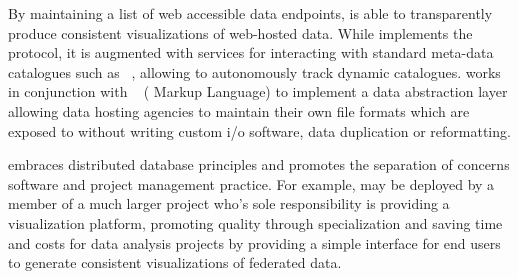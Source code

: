 By maintaining a list of web accessible data endpoints, \sciwms{} is
able to transparently produce consistent visualizations of web-hosted
data. While \sciwms{} implements the \ogc{} \wms{}~\cite{wms14}
protocol, it is augmented with services for interacting with standard
meta-data catalogues such as \csw{}~\cite{csw14}, allowing \sciwms{}
to autonomously track dynamic catalogues. \sciwms{} works in conjunction
with \ncml{}~\cite{ncml06} (\netcdf{} Markup Language) to implement a data
abstraction layer allowing data hosting agencies to maintain their own
file formats which are exposed to \sciwms{} without writing custom i/o
software, data duplication or reformatting.

\sciwms{} embraces distributed database principles and promotes the
separation of concerns software and project management practice. For
example, \sciwms{} may be deployed by a member of a much larger
project who's sole responsibility is providing a visualization
platform, promoting quality through specialization and saving time and
costs for data analysis projects by providing a simple interface for
end users to generate consistent visualizations of federated data.
